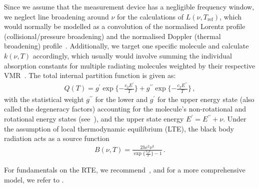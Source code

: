 Since we assume that the measurement device has a negligible frequency window, we neglect line broadening around $\nu$ for the calculations of $L(\nu, T_{\text{ref}})$, which would normally be modelled as a convolution of the normalised Lorentz profile (collisional/pressure broadening) and the normalised Doppler (thermal broadening) profile~\cite{mipas2000handbook}.
Additionally, we target one specific molecule and calculate $k(\nu, T)$ accordingly, which usually would involve summing the individual absorption constants for multiple radiating molecules weighted by their respective VMR~\cite{mipas2000handbook}.
The total internal partition function is given as:
\begin{align}
	Q(T )= g^{ \prime} \exp{\{ - \frac{ c_2 E^{ \prime} }{T}\}} + g^{\prime \prime} \exp{\{ - \frac{ c_2 E^{\prime \prime} }{T}\}} \, ,
\end{align}
with the statistical weight $ g^{\prime \prime}$ for the lower and $ g^{ \prime}$ for the upper energy state (also called the degeneracy factors) accounting for the molecule's non-rotational and rotational energy states (see~\cite{vsimevckova2006einstein}), and the upper state energy $E^{ \prime} = E^{ \prime\prime} + \nu$.
Under the assumption of local thermodynamic equilibrium (LTE), the black body radiation acts as a source function
\begin{align}
	B(\nu,T)   = \frac{2 h c^2 \nu^3}{\exp{\{\frac{c_2\nu}{ T}\}}-1}\, .
\end{align}

For fundamentals on the RTE, we recommend~\cite[Chapter 1]{rybicki2000rte}, and for a more comprehensive model, we refer to \cite{read2006forwardModel}.



